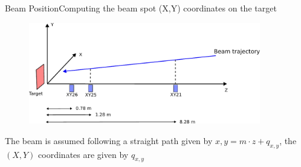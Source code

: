 \documentclass[9pt,a4paper]{beamer}
\begin{document}
\begin{frame}{Beam Position}{Computing the beam spot (X,Y) coordinates on the target}

\begin{figure}[hbtp]
\centering
\includegraphics[width = 0.9\textwidth]{figures/scheme.pdf}
\end{figure}

The beam is assumed following a straight path given by $x,y = m\cdot z + q_{x,y}$, the $(X,Y)$ coordinates are given by $q_{x,y}$

\end{frame}
\end{document}
